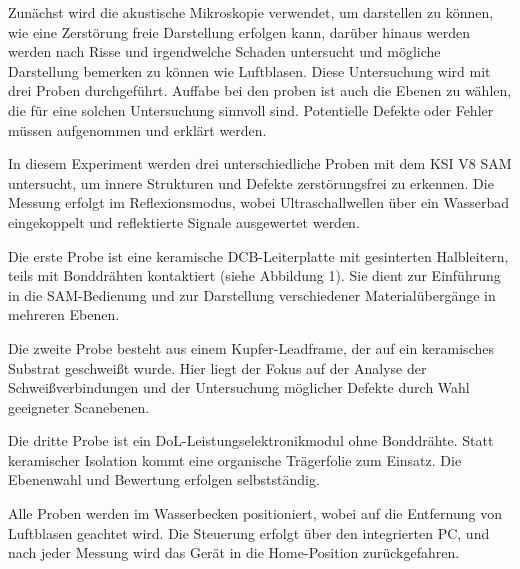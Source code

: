 Zunächst wird die akustische Mikroskopie verwendet, um darstellen zu können, wie eine Zerstörung freie Darstellung erfolgen kann, darüber hinaus werden werden nach Risse und irgendwelche Schaden untersucht und mögliche Darstellung bemerken zu können wie Luftblasen. Diese Untersuchung wird mit drei Proben durchgeführt.
Auffabe bei den proben ist auch die Ebenen zu wählen, die für eine solchen Untersuchung sinnvoll sind.  Potentielle
Defekte oder Fehler müssen aufgenommen und erklärt werden.


In diesem Experiment werden drei unterschiedliche Proben mit dem KSI V8 SAM untersucht, um innere Strukturen und Defekte zerstörungsfrei zu erkennen. Die Messung erfolgt im Reflexionsmodus, wobei Ultraschallwellen über ein Wasserbad eingekoppelt und reflektierte Signale ausgewertet werden.

Die erste Probe ist eine keramische DCB-Leiterplatte mit gesinterten Halbleitern, teils mit Bonddrähten kontaktiert (siehe Abbildung 1). Sie dient zur Einführung in die SAM-Bedienung und zur Darstellung verschiedener Materialübergänge in mehreren Ebenen.

Die zweite Probe besteht aus einem Kupfer-Leadframe, der auf ein keramisches Substrat geschweißt wurde. Hier liegt der Fokus auf der Analyse der Schweißverbindungen und der Untersuchung möglicher Defekte durch Wahl geeigneter Scanebenen.

Die dritte Probe ist ein DoL-Leistungselektronikmodul ohne Bonddrähte. Statt keramischer Isolation kommt eine organische Trägerfolie zum Einsatz. Die Ebenenwahl und Bewertung erfolgen selbstständig.

Alle Proben werden im Wasserbecken positioniert, wobei auf die Entfernung von Luftblasen geachtet wird. Die Steuerung erfolgt über den integrierten PC, und nach jeder Messung wird das Gerät in die Home-Position zurückgefahren.
